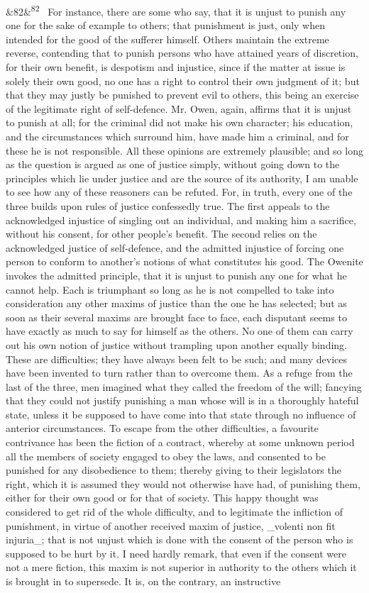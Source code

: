 \documentclass[12pt]{article}
\newcommand{\para}[1][]{\par\noindent\ifx&#1&\else\textsuperscript{\footnotesize #1}~\fi}
\begin{document}
\para[82] For instance, there are some who say, that it is unjust to punish any one for the sake of example to others; that punishment is just, only when intended for the good of the sufferer himself. Others maintain the extreme reverse, contending that to punish persons who have attained years of discretion, for their own benefit, is despotism and injustice, since if the matter at issue is solely their own good, no one has a right to control their own judgment of it; but that they may justly be punished to prevent evil to others, this being an exercise of the legitimate right of self-defence. Mr. Owen, again, affirms that it is unjust to punish at all; for the criminal did not make his own character; his education, and the circumstances which surround him, have made him a criminal, and for these he is not responsible. All these opinions are extremely plausible; and so long as the question is argued as one of justice simply, without going down to the principles which lie under justice and are the source of its authority, I am unable to see how any of these reasoners can be refuted. For, in truth, every one of the three builds upon rules of justice confessedly true. The first appeals to the acknowledged injustice of singling out an individual, and making him a sacrifice, without his consent, for other people's benefit. The second relies on the acknowledged justice of self-defence, and the admitted injustice of forcing one person to conform to another's notions of what constitutes his good. The Owenite invokes the admitted principle, that it is unjust to punish any one for what he cannot help. Each is triumphant so long as he is not compelled to take into consideration any other maxims of justice than the one he has selected; but as soon as their several maxims are brought face to face, each disputant seems to have exactly as much to say for himself as the others. No one of them can carry out his own notion of justice without trampling upon another equally binding. These are difficulties; they have always been felt to be such; and many devices have been invented to turn rather than to overcome them. As a refuge from the last of the three, men imagined what they called the freedom of the will; fancying that they could not justify punishing a man whose will is in a thoroughly hateful state, unless it be supposed to have come into that state through no influence of anterior circumstances. To escape from the other difficulties, a favourite contrivance has been the fiction of a contract, whereby at some unknown period all the members of society engaged to obey the laws, and consented to be punished for any disobedience to them; thereby giving to their legislators the right, which it is assumed they would not otherwise have had, of punishing them, either for their own good or for that of society. This happy thought was considered to get rid of the whole difficulty, and to legitimate the infliction of punishment, in virtue of another received maxim of justice, \_volenti non fit injuria\_; that is not unjust which is done with the consent of the person who is supposed to be hurt by it. I need hardly remark, that even if the consent were not a mere fiction, this maxim is not superior in authority to the others which it is brought in to supersede. It is, on the contrary, an instructive 
\end{document}
